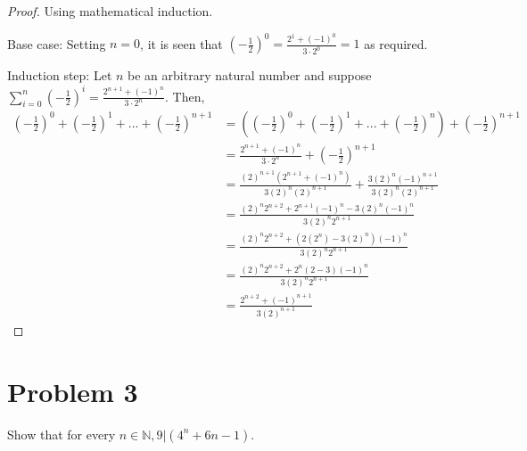 \documentclass{article}
\begin{document}
    \begin{proof}
        Using mathematical induction.

        Base case: Setting $n=0$, it is seen that $(-\frac{1}{2})^0=\frac{2^1+(-1)^0}{3\cdot 2^0} = 1$
        as required.

        Induction step: Let $n$ be an arbitrary natural number and suppose $\sum^n_{i=0} (-\frac{1}{2})^i=\frac{2^{n+1}+(-1)^n}{3\cdot 2^n}$.
        Then, 
        \begin{equation*}
            \begin{split}
                \left(-\frac{1}{2}\right)^0+\left(-\frac{1}{2}\right)^1+...+
                \left(-\frac{1}{2}\right)^{n+1} & = \left(\left(-\frac{1}{2}\right)^0+
                \left(-\frac{1}{2}\right)^1+... +\left(-\frac{1}{2}\right)^{n}\right) + 
                \left(-\frac{1}{2}\right)^{n+1} \\
                & = \frac{2^{n+1}+(-1)^n}{3\cdot 2^n} +\left(-\frac{1}{2}\right)^{n+1} \\
                & = \frac{(2)^{n+1}\left(2^{n+1}+(-1)^n\right)}{3(2)^n(2)^{n+1}} + 
                \frac{3(2)^n(-1)^{n+1}}{3(2)^n(2)^{n+1}} \\
                & = \frac{(2)^n2^{n+2}+2^{n+1}(-1)^n-3(2)^n(-1)^n}{3(2)^n2^{n+1}} \\
                & = \frac{(2)^n2^{n+2}+(2(2^n)-3(2)^n)(-1)^n}{3(2)^n2^{n+1}} \\
                & = \frac{(2)^n2^{n+2}+2^n(2-3)(-1)^n}{3(2)^n2^{n+1}} \\
                & = \frac{2^{n+2}+(-1)^{n+1}}{3(2)^{n+1}}
            \end{split}
        \end{equation*}
    \end{proof}


    \section*{Problem 3}

    Show that for every $n\in\mathbb{N}, 9|(4^n+6n-1)$.
\end{document}
